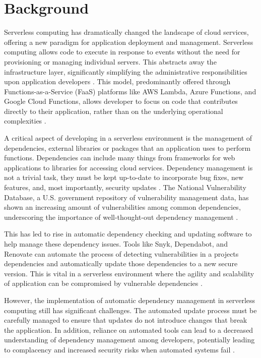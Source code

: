 \documentclass[sigconf]{acmart}
\begin{document}
\section{Background}
Serverless computing has dramatically changed the landscape of cloud services, offering a new paradigm for application deployment and management. Serverless computing allows code to execute in response to events without the need for provisioning or managing individual servers. This abstracts away the infrastructure layer, significantly simplifying the administrative responsibilities upon application developers \cite{roberts2020lambda}. This model, predominantly offered through Functions-as-a-Service (FaaS) platforms like AWS Lambda, Azure Functions, and Google Cloud Functions, allows developer to focus on code that contributes directly to their application, rather than on the underlying operational complexities \cite{villamizar2015evaluating}.

A critical aspect of developing in a serverless environment is the management of dependencies, external libraries or packages that an application uses to perform functions. Dependencies can include many things from frameworks for web applications to libraries for accessing cloud services. Dependency management is not a trivial task, they must be kept up-to-date to incorporate bug fixes, new features, and, most importantly, security updates \cite{benischke2023updates}. The National Vulnerability Database, a U.S. government repository of vulnerability management data, has shown an increasing amount of vulnerabilities among common dependencies, underscoring the importance of well-thought-out dependency management \cite{NVDdatabase}.

This has led to rise in automatic dependency checking and updating software to help manage these dependency issues. Tools like Snyk, Dependabot, and Renovate can automate the process of detecting vulnerabilities in a projects dependencies and automatically update those dependencies to a new secure version. This is vital in a serverless environment where the agility and scalability of application can be compromised by vulnerable dependencies \cite{estrin2021handbook}.

However, the implementation of automatic dependency management in serverless computing still has significant challenges. The automated update process must be carefully managed to ensure that updates do not introduce changes that break the application. In addition, reliance on automated tools can lead to a decreased understanding of dependency management among developers, potentially leading to complacency and increased security risks when automated systems fail \cite{hilton2016ci}.
\end{document}
